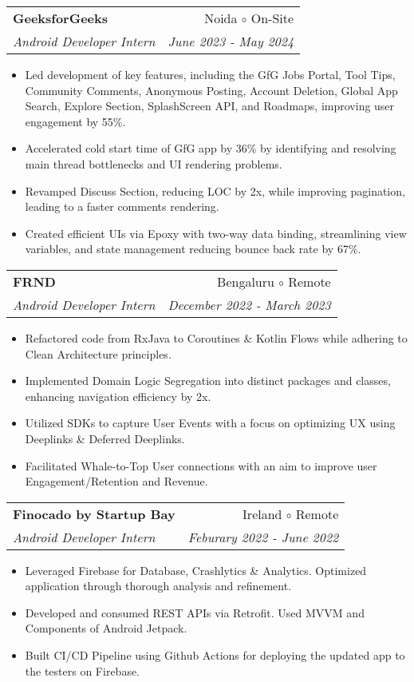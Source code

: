 \documentclass[apaper,20pt]{article}
\makeatletter
\newcommand{\resumeSubheading}[4]{
  \vspace{-1pt}\item
    \begin{tabular*}{0.97\textwidth}{l@{\extracolsep{\fill}}r}
      \textbf{#1} & #2 \\
      \textit{#3} & \textit{#4} \\
    \end{tabular*}\vspace{-5pt}
}
\makeatother
\begin{document}
\resumeSubheading
{GeeksforGeeks}{Noida $\circ$ On-Site}
{Android Developer Intern }{June 2023 - May 2024}
\begin{itemize}
    \item {Led development of key features, including the GfG Jobs Portal, Tool Tips, Community Comments, Anonymous Posting, Account Deletion, Global App Search, Explore Section, SplashScreen API, and Roadmaps, improving user engagement by 55\%.}
    \item {Accelerated cold start time of GfG app by 36\% by identifying and resolving main thread bottlenecks and UI rendering problems.}
	\item {Revamped Discuss Section, reducing LOC by 2x, while improving pagination, leading to a faster comments rendering.}
	\item {Created efficient UIs via Epoxy with two-way data binding, streamlining view variables, and state management reducing bounce back rate by 67\%.}
\end{itemize}
\vspace{-3pt}

\resumeSubheading
{FRND}{Bengaluru $\circ$ Remote}
{Android Developer Intern }{December 2022 - March 2023}
\begin{itemize}
	\item {Refactored code from RxJava to Coroutines \& Kotlin Flows while adhering to Clean Architecture principles.}
    \item {Implemented Domain Logic Segregation into distinct packages and classes, enhancing navigation efficiency by 2x.}
	\item {Utilized SDKs to capture User Events with a focus on optimizing UX using Deeplinks \& Deferred Deeplinks.}
	\item {Facilitated Whale-to-Top User connections with an aim to improve user Engagement/Retention and Revenue.}
\end{itemize}
\vspace{-3pt}

\resumeSubheading
{Finocado by Startup Bay}{Ireland $\circ$ Remote}
{Android Developer Intern }{Feburary 2022 - June 2022}
\begin{itemize}
    \item {Leveraged Firebase for Database, Crashlytics \& Analytics. Optimized application through thorough analysis and refinement.}
	\item {Developed and consumed REST APIs via Retrofit. Used MVVM and Components of Android Jetpack.}
	\item {Built CI/CD Pipeline using Github Actions for deploying the updated app to the testers on Firebase.}
\end{itemize}
\vspace{-3pt}
\end{document}
